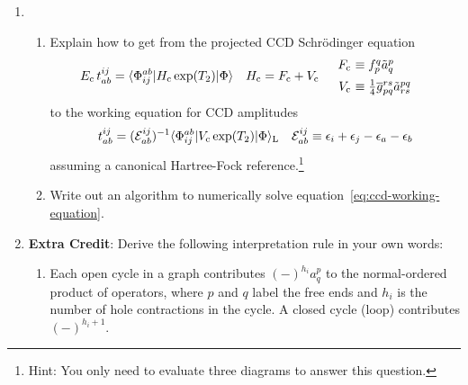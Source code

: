 \documentclass[11pt]{article}
\begin{document}
\begin{enumerate}
\newpage
\item
  \begin{enumerate}
  \item
    Explain how to get from the projected CCD Schr\"odinger equation
    \begin{align}
      E_\mr{c}\,t_{ab}^{ij}
    =
      \ip{\F_{ij}^{ab}|H_\mr{c}\,\mr{exp}(T_2)|\F}
    &&
        H_\mr{c}
      &=
        F_\mr{c}
      +
        V_\mr{c}
    &&
      \begin{array}{r@{\ }l}
        F_\mr{c}
      &\equiv
        f_p^q
        \tl{a}^p_q
      \\[5pt]
        V_\mr{c}
      &\equiv
        \tfr{1}{4}
        \ol{g}_{pq}^{rs}
        \tl{a}^{pq}_{rs}
      \end{array}
    \end{align}
    to the working equation for CCD amplitudes
    \begin{align}
    \label{eq:ccd-working-equation}
      t_{ab}^{ij}
    =
      (\mathcal{E}_{ab}^{ij})^{-1}
      \langle\Phi _{ij}^{ab}|V_{\mathrm{c}}\,\mathrm{exp}(T_2)|\Phi \rangle_{\mathrm{L}}
    &&
      \mathcal{E}_{ab}^{ij}
    \equiv
      \epsilon _i
    +
      \epsilon _j
    -
      \epsilon _a
    -
      \epsilon _b
    \end{align}
    assuming a canonical Hartree-Fock reference.\footnote{Hint:
    You only need to evaluate three diagrams to answer this question.}

  \item
    Write out an algorithm to numerically solve equation~\ref{eq:ccd-working-equation}.
  \end{enumerate}


\newpage
\item[]
  \textbf{Extra Credit}:
  Derive the following interpretation rule in your own words:
  \begin{enumerate}
  \item[]
    Each open cycle in a graph contributes $(-)^{h_i}a^p_q$ to the normal-ordered product of operators, where $p$ and $q$ label the free ends and $h_i$ is the number of hole contractions in the cycle.
  A closed cycle (loop) contributes $(-)^{h_i+1}$.
  \end{enumerate}
\end{enumerate}
\end{document}
